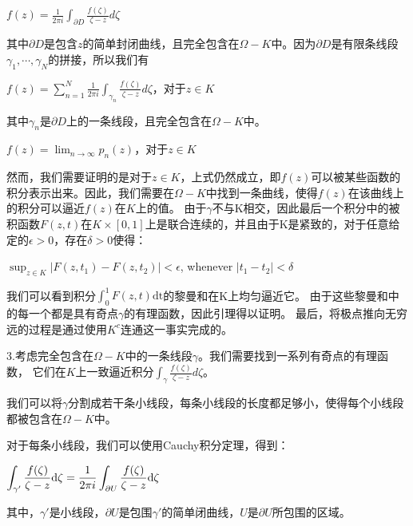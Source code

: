 \documentclass[12pt, a4paper, oneside]{article}
\begin{document}
\begin{spacing}{2.0}
\begin{center}
$f(z) = \displaystyle\frac{1}{2\pi i}\int_{\partial D} \frac{f(\zeta)}{\zeta - z} d\zeta$
\end{center}

其中$\partial D$是包含$z$的简单封闭曲线，且完全包含在$\Omega - K$中。因为$\partial D$是有限条线段$\gamma_1,\cdots,\gamma_N$的拼接，所以我们有

\begin{center}
$f(z) = \displaystyle\sum_{n = 1}^{N}\frac{1}{2\pi i}\int_{\gamma_n}\frac{f(\zeta)}{\zeta - z}d\zeta$，对于$z\in K$
\end{center}

其中$\gamma_n$是$\partial D$上的一条线段，且完全包含在$\Omega - K$中。
\begin{center}
$\displaystyle f(z) = \lim_{n \to \infty}p_n(z)$，对于$z\in K$
\end{center}

然而，我们需要证明的是对于$z\in K$，上式仍然成立，即$f(z)$可以被某些函数的积分表示出来。因此，我们需要在$\Omega-K$中找到一条曲线，使得$f(z)$在该曲线上的积分可以逼近$f(z)$在$K$上的值。
由于$\gamma$不与K相交，因此最后一个积分中的被积函数$F(z,t)$在$K\times[0,1]$上是联合连续的，并且由于K是紧致的，对于任意给定的$\epsilon>0$，存在$\delta>0$使得：
\begin{center}
    $\displaystyle\sup_{z\in K}|F(z, t_1)-F(z, t_2)|<\epsilon$, whenever $|t_1-t_2|<\delta$
\end{center}

我们可以看到积分$\displaystyle\int_0^1 F(z, t) \mathrm{dt}$的黎曼和在K上均匀逼近它。
由于这些黎曼和中的每一个都是具有奇点$\gamma$的有理函数，因此引理得以证明。
最后，将极点推向无穷远的过程是通过使用$K^c$连通这一事实完成的。




3.考虑完全包含在$\Omega-K$中的一条线段$\gamma$。我们需要找到一系列有奇点的有理函数，
它们在$K$上一致逼近积分$\displaystyle\int_{\gamma}\frac{f(\zeta)}{\zeta-z}d\zeta$。

我们可以将$\gamma$分割成若干条小线段，每条小线段的长度都足够小，使得每个小线段都被包含在$\Omega-K$中。

对于每条小线段，我们可以使用Cauchy积分定理，得到：
\begin{center}
    $\displaystyle \displaystyle\int_{\gamma'}\frac{f(\zeta)}{\zeta-z}\mathrm{d\zeta} = \frac{1}{2\pi i} \displaystyle\int_{\partial U}\frac{f(\zeta)}{\zeta - z}\mathrm{d\zeta}$
\end{center}
其中，$\gamma'$是小线段，$\partial U$是包围$\gamma'$的简单闭曲线，$U$是$\partial U$所包围的区域。


\end{spacing}
\end{document}
